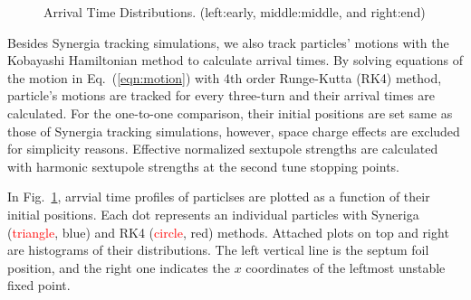 \documentclass[aps,prstab,onecolumn,preprint,endfloats,11pt]{revtex4-1}
\begin{document}
\begin{figure}[!tbp]
  \caption{\label{fig:arrival2}Arrival Time Distributions. (left:early, middle:middle, and right:end)}
\end{figure}

Besides Synergia tracking simulations, we also track particles' motions with the Kobayashi Hamiltonian method to calculate arrival times. By solving equations of the motion in Eq.~(\ref{eqn:motion}) with 4th order Runge-Kutta (RK4) method, particle's motions are tracked for every three-turn and their arrival times are calculated. For the one-to-one comparison, their initial positions are set same as those of Synergia tracking simulations, however, space charge effects are excluded for simplicity reasons. Effective normalized sextupole strengths are calculated with harmonic sextupole strengths at the second tune stopping points.

In Fig.~\ref{fig:arrival2}, arrvial time profiles of particlses are plotted as a function of their initial positions. Each dot represents an individual particles with Syneriga (\textcolor{red}{triangle}, blue) and RK4 (\textcolor{red}{circle}, red) methods. Attached plots on top and right are histograms of their distributions. The left vertical line is the septum foil position, and the right one indicates the $x$ coordinates of the leftmost unstable fixed point. 
\end{document}
